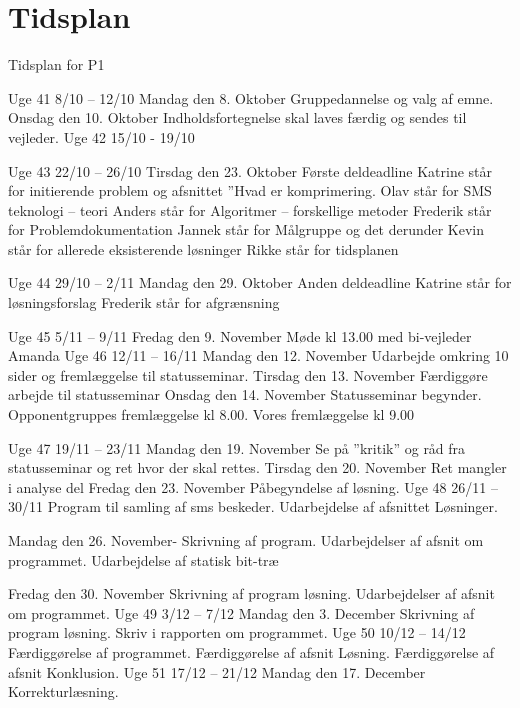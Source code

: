 \section{Tidsplan}
Tidsplan for P1

Uge 41 8/10 – 12/10
Mandag den 8. Oktober                            Gruppedannelse og valg af emne.
Onsdag den 10. Oktober                          Indholdsfortegnelse skal laves færdig og sendes til vejleder.
Uge 42 15/10 - 19/10
 
Uge 43 22/10 – 26/10
Tirsdag den 23. Oktober                          Første deldeadline
Katrine står for initierende problem og afsnittet ”Hvad er komprimering.
Olav står for SMS teknologi – teori
Anders står for Algoritmer – forskellige metoder
Frederik står for Problemdokumentation
Jannek står for Målgruppe og det derunder
Kevin står for allerede eksisterende løsninger
Rikke står for tidsplanen
 
Uge 44 29/10 – 2/11
Mandag den 29. Oktober                         Anden deldeadline
                                                                 Katrine står for løsningsforslag
                                                                 Frederik står for afgrænsning
                                                                              	
Uge 45 5/11 – 9/11
Fredag den 9. November                         Møde kl 13.00 med bi-vejleder Amanda
Uge 46 12/11 – 16/11
Mandag den 12. November                      Udarbejde omkring 10 sider og fremlæggelse til statusseminar.
Tirsdag den 13. November                       Færdiggøre arbejde til statusseminar
Onsdag den 14. November                      Statusseminar begynder. 
Opponentgruppes fremlæggelse kl 8.00. 
Vores fremlæggelse kl 9.00

Uge 47 19/11 – 23/11
Mandag den 19. November                      Se på ”kritik” og råd fra statusseminar og ret hvor der skal rettes.
Tirsdag den 20. November                      Ret mangler i analyse del
Fredag den 23. November                       Påbegyndelse af løsning.
Uge 48 26/11 – 30/11
	Program til samling af sms beskeder. 
Udarbejdelse af afsnittet Løsninger.

Mandag den 26. November-                     Skrivning af program. 
Udarbejdelser af afsnit om programmet. 
Udarbejdelse af statisk bit-træ

Fredag den 30. November	Skrivning af program løsning. 
Udarbejdelser af afsnit om programmet.
Uge 49 3/12 – 7/12
Mandag den 3. December	Skrivning af program løsning. 
Skriv i rapporten om programmet.
Uge 50 10/12 – 14/12
	Færdiggørelse af programmet.
Færdiggørelse af afsnit Løsning.
Færdiggørelse af afsnit Konklusion.
Uge 51 17/12 – 21/12
Mandag den 17. December                     Korrekturlæsning.

